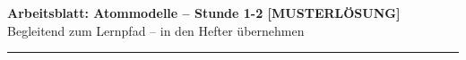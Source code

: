 \documentclass[10pt, a4paper]{article}
\newcommand{\thema}{Atommodelle}
\newcommand{\stunde}{Stunde 1-2}
\begin{document}

\begin{center}
{\large\bfseries Arbeitsblatt: \thema{} -- \stunde{} \textcolor{loesung}{[MUSTERLÖSUNG]}}\\[2pt]
{\small\textcolor{grau}{Begleitend zum Lernpfad -- in den Hefter übernehmen}}
\end{center}

\vspace{-2pt}
\hrule
\vspace{8pt}

\end{document}
